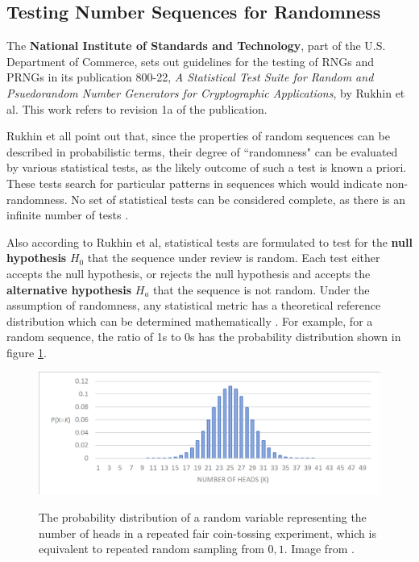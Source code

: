 \documentclass[12pt, titlepage]{report}
\theoremstyle{definition}
\begin{document}
\subsection{Testing Number Sequences for Randomness}\label{subsection:testing_prngs}
The \textbf{National Institute of Standards and Technology}, part of the U.S. Department of Commerce, sets out guidelines for the testing of RNGs and PRNGs in its publication 800-22, \textit{A Statistical Test Suite for Random and Psuedorandom Number Generators for Cryptographic Applications}, by Rukhin et al. This work refers to revision 1a of the publication.

Rukhin et all point out that, since the properties of random sequences can be described in probabilistic terms, their degree of ``randomness" can be evaluated by various statistical tests, as the likely outcome of such a test is known a priori. These tests search for particular patterns in sequences which would indicate non-randomness. No set of statistical tests can be considered complete, as there is an infinite number of tests \cite[p. 1-2]{rukhin2001statistical}.

Also according to Rukhin et al, statistical tests are formulated to test for the \textbf{null hypothesis} $H_0$ that the sequence under review is random. Each test either accepts the null hypothesis, or rejects the null hypothesis and accepts the \textbf{alternative hypothesis} $H_a$ that the sequence is not random. Under the assumption of randomness, any statistical metric has a theoretical reference distribution which can be determined mathematically \cite[p. 1.3]{rukhin2001statistical}. For example, for a random sequence, the ratio of 1s to 0s has the probability distribution shown in figure \ref{figure:distribution}.

\begin{figure}
\centering
\includegraphics[width=1\textwidth]{img/distribution.png}\\
\caption{The probability distribution of a random variable representing the number of heads in a repeated fair coin-tossing experiment, which is equivalent to repeated random sampling from ${0, 1}$. Image from \cite{terr2009math}.}
\label{figure:distribution}
\end{figure}
	
\end{document}
